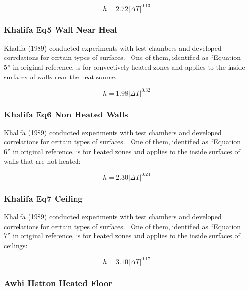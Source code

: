 \begin{equation}
h = 2.72{\left| {\Delta T} \right|^{0.13}}
\end{equation}

\subsubsection{Khalifa Eq5 Wall Near Heat}\label{khalifa-eq5-wall-near-heat}

Khalifa (1989) conducted experiments with test chambers and developed correlations for certain types of surfaces.~ One of them, identified as ``Equation 5'' in original reference, is for convectively heated zones and applies to the inside surfaces of walls near the heat source:

\begin{equation}
h = 1.98{\left| {\Delta T} \right|^{0.32}}
\end{equation}

\subsubsection{Khalifa Eq6 Non Heated Walls}\label{khalifa-eq6-non-heated-walls}

Khalifa (1989) conducted experiments with test chambers and developed correlations for certain types of surfaces.~ One of them, identified as ``Equation 6'' in original reference, is for heated zones and applies to the inside surfaces of walls that are not heated:

\begin{equation}
h = 2.30{\left| {\Delta T} \right|^{0.24}}
\end{equation}

\subsubsection{Khalifa Eq7 Ceiling}\label{khalifa-eq7-ceiling}

Khalifa (1989) conducted experiments with test chambers and developed correlations for certain types of surfaces.~ One of them, identified as ``Equation 7'' in original reference, is for heated zones and applies to the inside surfaces of ceilings:

\begin{equation}
h = 3.10{\left| {\Delta T} \right|^{0.17}}
\end{equation}

\subsubsection{Awbi Hatton Heated Floor}\label{awbi-hatton-heated-floor}

